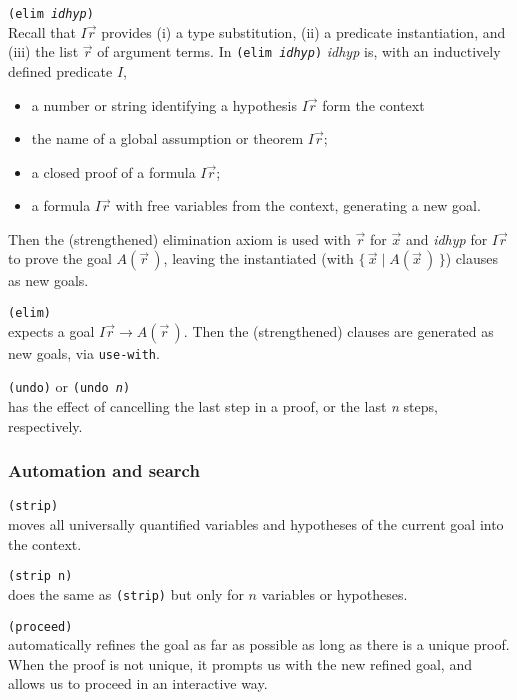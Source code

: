\documentclass[12pt]{amsart}
\newcommand{\set}[2]{\{\,#1\mid#2\,\}}
\begin{document}
\texttt{(elim \textsl{idhyp})}\\
Recall that $I \vec{r}$ provides (i) a type substitution, (ii) a
predicate instantiation, and (iii) the list $\vec{r}$ of argument
terms.  In \texttt{(elim \textsl{idhyp})}
\textsl{idhyp} is, with an inductively defined predicate $I$,
\begin{itemize}
\item a number or string identifying a hypothesis $I \vec{r}$ form the
  context
\item the name of a global assumption or theorem $I \vec{r}$;
\item a closed proof of a formula $I \vec{r}$;
\item a formula $I \vec{r}$ with free variables from the context,
  generating a new goal.
\end{itemize}
Then the (strengthened) elimination axiom is used with $\vec{r}$ for
$\vec{x}$ and \textsl{idhyp} for $I \vec{r}$ to prove the goal
$A(\vec{r}\,)$, leaving the instantiated (with $\set {\vec{x}}
{A(\vec{x}\,)}$) clauses as new goals.

\texttt{(elim)}\\
expects a goal $I \vec{r} \to A(\vec{r}\,)$.  Then the (strengthened)
clauses are generated as new goals, via \texttt{use-with}.

\texttt{(undo)}
or \texttt{(undo \textsl{n})}\\
has the effect of cancelling the last step in a proof, or the
last  \textsl{n} steps, respectively.


\subsubsection{Automation and search}\quad

\texttt{(strip)}\\
moves all universally quantified variables
and hypotheses of the current goal into the context.

\texttt{(strip n)}\\
does the same as \texttt{(strip)}
but only for $n$ variables or hypotheses.

\texttt{(proceed)}\\
automatically refines the goal as far as possible as long as there is
a unique proof.  When the proof is not unique, it prompts us with the
new refined goal, and allows us to proceed in an
interactive way.
\end{document}
